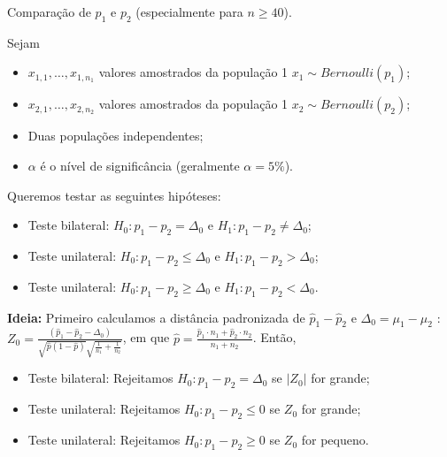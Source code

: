 \documentclass[9pt]{beamer}
\begin{document}
\begin{frame}{Comparação de $p_1$ e $p_2$ (especialmente para $n \geq 40$).}

\normalsize
Sejam
\begin{itemize}
	\item $x_{1,1}, \dots, x_{1, n_1}$ valores amostrados da população 1 $x_1 \sim Bernoulli(p_1)$;
	\item $x_{2,1}, \dots, x_{2, n_2}$ valores amostrados da população 1 $x_2 \sim Bernoulli(p_2)$;
	\item Duas populações independentes;
	\item $\alpha$ é o nível de significância (geralmente $\alpha=5\%$). 
\end{itemize}
\vfill

Queremos testar as seguintes hipóteses:
\begin{itemize}
	\item Teste bilateral: $H_0: p_1 - p_2 = \Delta_0$ e $H_1: p_1 - p_2 \neq \Delta_0$;
	\item Teste unilateral: $H_0: p_1 - p_2 \leq \Delta_0$ e $H_1: p_1 - p_2 > \Delta_0$;
	\item Teste unilateral: $H_0: p_1 - p_2 \geq \Delta_0$ e $H_1: p_1 - p_2 < \Delta_0$.
\end{itemize}
\vfill

\textbf{Ideia:} Primeiro calculamos a distância padronizada de $\hat{p}_1 - \hat{p}_2$ e $\Delta_0=\mu_1 - \mu_2$ : $Z_0 = \frac{(\hat{p}_1 - \hat{p}_2 - \Delta_0)}{\sqrt{\hat{p}(1 - \hat{p})}\sqrt{\frac{1}{n_1} + \frac{1}{n_2}}}$, em que $\hat{p} = \frac{\hat{p}_1 \cdot n_1 + \hat{p}_2 \cdot n_2}{n_1 + n_2}$. Então, 
\begin{itemize}
	\item Teste bilateral: Rejeitamos $H_0: p_1 - p_2 =\Delta_0$ se $\lvert Z_0 \rvert$ for grande;
	\item Teste unilateral: Rejeitamos $H_0: p_1 - p_2 \leq 0$ se $Z_0 $ for grande;
	\item Teste unilateral: Rejeitamos $H_0: p_1 - p_2 \geq 0$ se $Z_0 $ for pequeno.
\end{itemize}
\normalsize
\end{frame}
\end{document}
